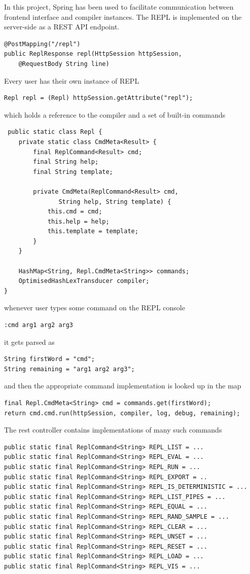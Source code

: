 In this project, Spring has been used to facilitate communication between frontend interface and compiler instances. The REPL is implemented on the server-side as a REST API endpoint. 
\begin{lstlisting}
@PostMapping("/repl")
public ReplResponse repl(HttpSession httpSession, 
    @RequestBody String line)
\end{lstlisting}
Every user has their own instance of REPL
\begin{lstlisting}
Repl repl = (Repl) httpSession.getAttribute("repl");
\end{lstlisting}
which holds a reference to the compiler and a set of built-in commands
\begin{lstlisting}
 public static class Repl {
    private static class CmdMeta<Result> {
        final ReplCommand<Result> cmd;
        final String help;
        final String template;
        
        private CmdMeta(ReplCommand<Result> cmd, 
               String help, String template) {
            this.cmd = cmd;
            this.help = help;
            this.template = template;
        }
    }
     
    HashMap<String, Repl.CmdMeta<String>> commands;
    OptimisedHashLexTransducer compiler;
}
\end{lstlisting}
whenever user types some command on the REPL console
\begin{lstlisting}
:cmd arg1 arg2 arg3
\end{lstlisting}
it gets parsed as
\begin{lstlisting}
String firstWord = "cmd";
String remaining = "arg1 arg2 arg3";
\end{lstlisting}
and then the appropriate command implementation is looked up in the map
\begin{lstlisting}
final Repl.CmdMeta<String> cmd = commands.get(firstWord);
return cmd.cmd.run(httpSession, compiler, log, debug, remaining);
\end{lstlisting}
The rest controller contains implementations of many such commands
\begin{lstlisting}
public static final ReplCommand<String> REPL_LIST = ...
public static final ReplCommand<String> REPL_EVAL = ...
public static final ReplCommand<String> REPL_RUN = ...
public static final ReplCommand<String> REPL_EXPORT = ..
public static final ReplCommand<String> REPL_IS_DETERMINISTIC = ...
public static final ReplCommand<String> REPL_LIST_PIPES = ...
public static final ReplCommand<String> REPL_EQUAL = ...
public static final ReplCommand<String> REPL_RAND_SAMPLE = ...
public static final ReplCommand<String> REPL_CLEAR = ...
public static final ReplCommand<String> REPL_UNSET = ...
public static final ReplCommand<String> REPL_RESET = ...
public static final ReplCommand<String> REPL_LOAD = ...
public static final ReplCommand<String> REPL_VIS = ...
\end{lstlisting}
